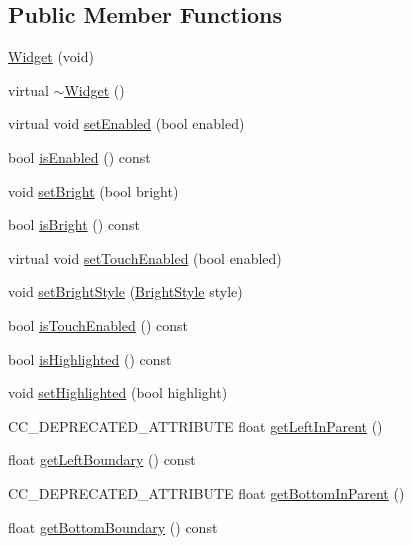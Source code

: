 \subsection*{Public Member Functions}
\begin{DoxyCompactItemize}
\item 
\hyperlink{classui_1_1Widget_a57287568cdb4b8e94303535c2d9cf892}{Widget} (void)
\item 
virtual \hyperlink{classui_1_1Widget_a3c336c3bbb6d172611851179073ecacc}{$\sim$\+Widget} ()
\item 
virtual void \hyperlink{classui_1_1Widget_a53b38b17228173b7ba8fe5f141a20bb8}{set\+Enabled} (bool enabled)
\item 
bool \hyperlink{classui_1_1Widget_a483d1547b7786c8a8da795f1f2ca1342}{is\+Enabled} () const
\item 
void \hyperlink{classui_1_1Widget_a70d4eaf022be75ac84d09782f4a68e76}{set\+Bright} (bool bright)
\item 
bool \hyperlink{classui_1_1Widget_a7c8b52f349c997848f23896acba7a44f}{is\+Bright} () const
\item 
virtual void \hyperlink{classui_1_1Widget_afd236dbe16327a48db557c58d2d2f991}{set\+Touch\+Enabled} (bool enabled)
\item 
void \hyperlink{classui_1_1Widget_a9647a3476eaa459a0f70fb91710714f9}{set\+Bright\+Style} (\hyperlink{classui_1_1Widget_a4040e89d49e005b771ac8a80a13206fc}{Bright\+Style} style)
\item 
bool \hyperlink{classui_1_1Widget_aad4e2d18440585570baae60a85d5f97a}{is\+Touch\+Enabled} () const
\item 
bool \hyperlink{classui_1_1Widget_ae95900edba414cdf224bdd528de84091}{is\+Highlighted} () const
\item 
void \hyperlink{classui_1_1Widget_ad18c81cef2447dcfb59b7f4250b0eeeb}{set\+Highlighted} (bool highlight)
\item 
C\+C\+\_\+\+D\+E\+P\+R\+E\+C\+A\+T\+E\+D\+\_\+\+A\+T\+T\+R\+I\+B\+U\+TE float \hyperlink{classui_1_1Widget_a316405b0bce9cb99a3efcef9b9754a86}{get\+Left\+In\+Parent} ()
\item 
float \hyperlink{classui_1_1Widget_a8385fe9b6ee78928d9c585e2faf0bc0d}{get\+Left\+Boundary} () const
\item 
C\+C\+\_\+\+D\+E\+P\+R\+E\+C\+A\+T\+E\+D\+\_\+\+A\+T\+T\+R\+I\+B\+U\+TE float \hyperlink{classui_1_1Widget_a91d67290067178a0a7534edb06756495}{get\+Bottom\+In\+Parent} ()
\item 
float \hyperlink{classui_1_1Widget_a70fffbbaaff8cfcccb305e3b90bb85e6}{get\+Bottom\+Boundary} () const

\end{DoxyCompactItemize}
